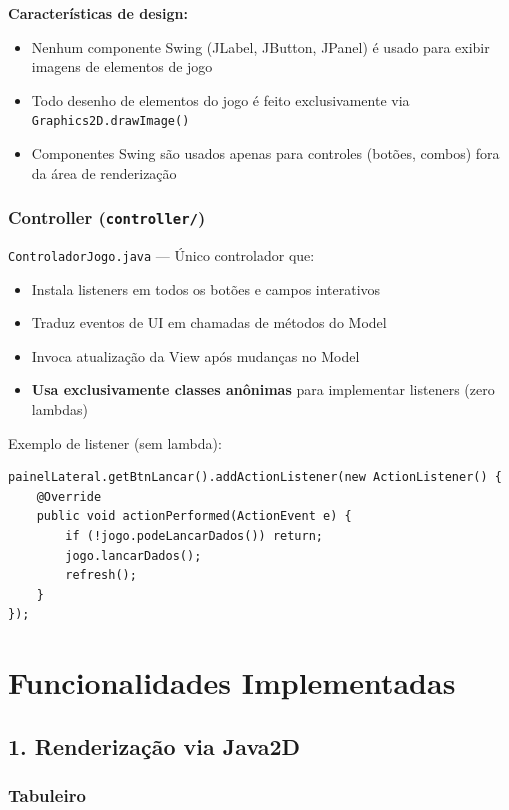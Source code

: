 \documentclass[12pt,a4paper]{report}
\begin{document}
\textbf{Características de design:}
\begin{itemize}
    \item Nenhum componente Swing (JLabel, JButton, JPanel) é usado para exibir imagens de elementos de jogo
    \item Todo desenho de elementos do jogo é feito exclusivamente via \texttt{Graphics2D.drawImage()}
    \item Componentes Swing são usados apenas para controles (botões, combos) fora da área de renderização
\end{itemize}

\subsection{Controller (\texttt{controller/})}

\texttt{ControladorJogo.java} --- Único controlador que:

\begin{itemize}
    \item Instala listeners em todos os botões e campos interativos
    \item Traduz eventos de UI em chamadas de métodos do Model
    \item Invoca atualização da View após mudanças no Model
    \item \textbf{Usa exclusivamente classes anônimas} para implementar listeners (zero lambdas)
\end{itemize}

Exemplo de listener (sem lambda):
\begin{lstlisting}
painelLateral.getBtnLancar().addActionListener(new ActionListener() {
    @Override
    public void actionPerformed(ActionEvent e) {
        if (!jogo.podeLancarDados()) return;
        jogo.lancarDados();
        refresh();
    }
});
\end{lstlisting}

\chapter{Funcionalidades Implementadas}

\section{1. Renderização via Java2D}

\subsection{Tabuleiro}
\end{document}
